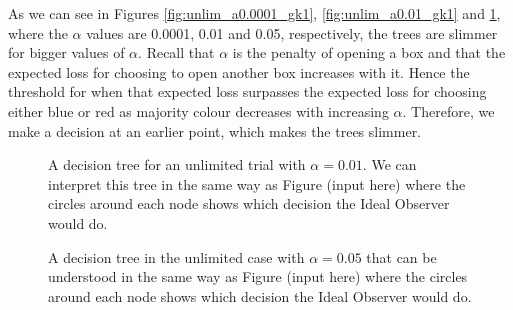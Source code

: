 As we can see in Figures \ref{fig:unlim_a0.0001_gk1}, \ref{fig:unlim_a0.01_gk1} and \ref{fig:unlim_a0.05_gk1}, where the $\alpha$ values are 0.0001, 0.01 and 0.05, respectively, the trees are slimmer for bigger values of $\alpha$. Recall that $\alpha$ is the penalty of opening a box and that the expected loss for choosing to open another box increases with it. Hence the threshold for when that expected loss surpasses the expected loss for choosing either blue or red as majority colour decreases with increasing $\alpha$. Therefore, we make a decision at an earlier point, which makes the trees slimmer.
\begin{figure}
    \centering
    \begin{minipage}{0.45\textwidth} 
        \centering
        \scalebox{0.5}{}
        \caption[IO solution, unlimited. $\alpha=0.01$,$\gamma=\kappa=1$]{A decision tree for an unlimited trial with $\alpha = 0.01$. 
        We can interpret this tree in the same way as Figure (input here) where the circles around each node shows which decision the Ideal Observer would do.}
        \label{fig:unlim_a0.01_gk1}
    \end{minipage}\hfill
    \begin{minipage}{0.45\textwidth} 
        \centering
        \scalebox{0.5}{}
        \caption[IO solution, unlimited. $\alpha=0.05$,$\gamma=\kappa=1$]{A decision tree in the unlimited case with $\alpha = 0.05$ that can be understood in the same way as Figure (input here) where the circles around each node shows which decision the Ideal Observer would do.}
        \label{fig:unlim_a0.05_gk1}
    \end{minipage}
\end{figure}


